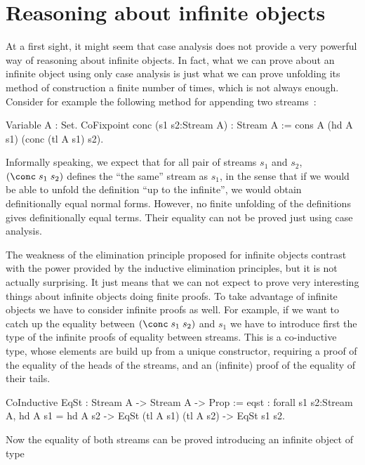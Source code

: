 \section{Reasoning about infinite objects}

At a first sight, it might seem that 
case analysis does not provide a very powerful way
of reasoning about infinite objects. In fact, what we can prove about 
an infinite object using
only case analysis is just what we can prove unfolding its method
of construction a finite number of times, which is not always
enough. Consider for example the following method for appending 
two streams~:
\begin{coq_example}
Variable A : Set.
CoFixpoint conc (s1 s2:Stream A) : Stream A :=
  cons A (hd A s1) (conc (tl A s1) s2).
\end{coq_example}

Informally speaking, we expect that for all pair of streams $s_1$ and $s_2$, 
$(\conc\;s_1\;s_2)$ 
defines the ``the same'' stream as $s_1$, 
in the sense that if we would be able to unfold the definition 
``up to the infinite'', we would obtain definitionally equal normal forms.
However, no finite unfolding of the definitions gives definitionally 
equal terms. Their equality can not be proved just using case analysis.


The weakness of the elimination principle proposed for infinite objects
contrast with the power provided by the inductive 
elimination principles, but it is not actually surprising. It just means
that we can not expect to prove very interesting things about infinite
objects doing finite proofs. To take advantage of infinite objects we
have to consider infinite proofs as well. For example,
if we want to catch up the equality between $(\conc\;s_1\;s_2)$ and 
$s_1$ we have to introduce first the type of the infinite proofs 
of equality between streams. This is a 
co-inductive type, whose elements are build up from a 
unique constructor, requiring a proof of the equality of the
heads of the streams, and an (infinite) proof of the equality 
of their tails. 

\begin{coq_example}
CoInductive EqSt : Stream A -> Stream A -> Prop :=
    eqst :
      forall s1 s2:Stream A,
        hd A s1 = hd A s2 -> EqSt (tl A s1) (tl A s2) -> EqSt s1 s2.
\end{coq_example}
\noindent Now the equality of both streams can be proved introducing
an infinite object of type 

